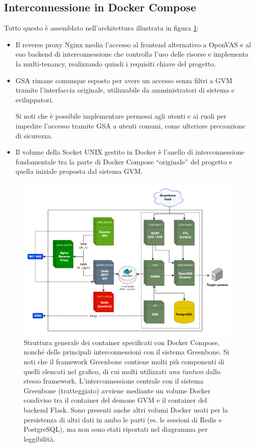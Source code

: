 \subsection{Interconnessione in Docker Compose}
\label{compose-architecture}
Tutto questo è assemblato nell'architettura illustrata in figura \ref{fig:architecture}:
\begin{itemize}
    \item Il reverse proxy Nginx media l'accesso al frontend alternativo a OpenVAS e al suo backend di interconnessione che controlla l'uso delle risorse e implementa la multi-tenancy, realizzando quindi i requisiti chiave del progetto.
    \item GSA rimane comunque esposto per avere un accesso senza filtri a GVM tramite l'interfaccia originale, utilizzabile da amministratori di sistema e sviluppatori.
    
    Si noti che è possibile implementare permessi agli utenti e ai ruoli per impedire l'accesso tramite GSA a utenti comuni, come ulteriore precauzione di sicurezza.
    \item Il volume della Socket UNIX gestito in Docker è l'anello di interconnessione fondamentale tra la parte di Docker Compose ``originale'' del progetto e quella iniziale proposta dal sistema GVM.
\end{itemize}
\begin{figure}
    \centering
    \includegraphics[width=\textwidth]{img/systems.png}
    \caption{Struttura generale dei container specificati con Docker Compose, nonché delle principali interconnessioni con il sistema Greenbone. Si noti che il framework Greenbone contiene molti più componenti di quelli elencati nel grafico, di cui molti utilizzati \emph{una tantum} dallo stesso framework. L'interconnessione centrale con il sistema Greenbone (tratteggiato) avviene mediante un volume Docker condiviso tra il container del demone GVM e il container del backend Flask. Sono presenti anche altri volumi Docker usati per la persistenza di altri dati in ambo le parti (es. le sessioni di Redis e PostgreSQL), ma non sono stati riportati nel diagramma per leggibilità.}
    \label{fig:architecture}
\end{figure}